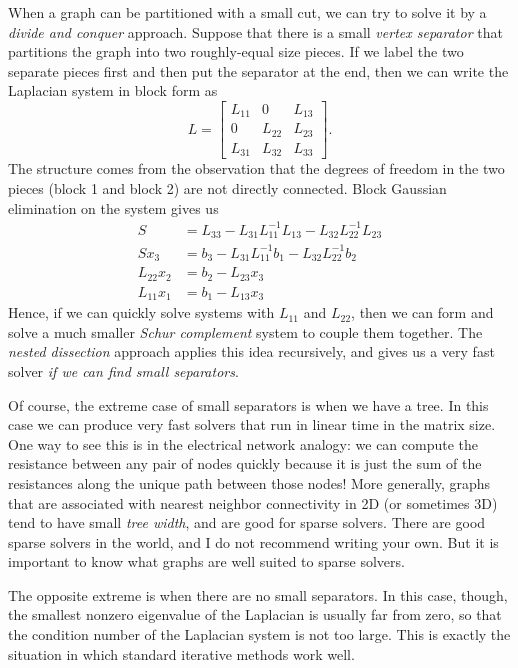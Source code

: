 \documentclass[12pt, leqno]{article} %
\begin{document}
When a graph can be partitioned with a small cut, we can try to solve
it by a {\em divide and conquer} approach.  Suppose that there is a
small {\em vertex separator} that partitions the graph into two
roughly-equal size pieces.  If we label the two separate pieces first
and then put the separator at the end, then we can write the Laplacian
system in block form as
\[
  L = 
  \begin{bmatrix}
    L_{11} & 0 & L_{13} \\
    0 & L_{22} & L_{23} \\
    L_{31} & L_{32} & L_{33}
  \end{bmatrix}.
\]
The structure comes from the observation that the degrees of freedom
in the two pieces (block 1 and block 2) are not directly connected.
Block Gaussian elimination on the system gives us
\begin{align*}
  S &= L_{33} - L_{31} L_{11}^{-1} L_{13} - L_{32} L_{22}^{-1} L_{23} \\
  S x_3 &= b_3 - L_{31} L_{11}^{-1} b_1 - L_{32} L_{22}^{-1} b_2 \\
  L_{22} x_2 &= b_2 - L_{23} x_3 \\
  L_{11} x_1 &= b_1 - L_{13} x_3
\end{align*}
Hence, if we can quickly solve systems with $L_{11}$ and $L_{22}$,
then we can form and solve a much smaller {\em Schur complement}
system to couple them together.  The {\em nested dissection} approach
applies this idea recursively, and gives us a very fast solver
{\em if we can find small separators}.

Of course, the extreme case of small separators is when we have
a tree.  In this case we can produce very fast solvers that run in
linear time in the matrix size.  One way to see this is in the
electrical network analogy: we can compute the resistance between
any pair of nodes quickly because it is just the sum of the
resistances along the unique path between those nodes!  More
generally, graphs that are associated with nearest neighbor
connectivity in 2D (or sometimes 3D) tend to have small
{\em tree width}, and are good for sparse solvers.  There are good
sparse solvers in the world, and I do not recommend writing your own.
But it is important to know what graphs are well suited to sparse solvers.

The opposite extreme is when there are no small separators.
In this case, though, the smallest nonzero eigenvalue of the Laplacian
is usually far from zero, so that the condition number of the
Laplacian system is not too large.  This is exactly the situation
in which standard iterative methods work well.
\end{document}
